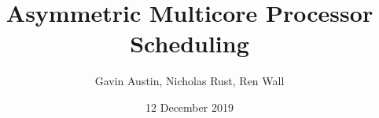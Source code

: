 \documentclass[12pt]{article}
\title{Asymmetric Multicore Processor Scheduling}
\author{Gavin Austin, Nicholas Rust, Ren Wall}
\date{12 December 2019}
\begin{document}
\maketitle

	
	
	
	
	
	
	
	
\newpage
{}

\end{document}
